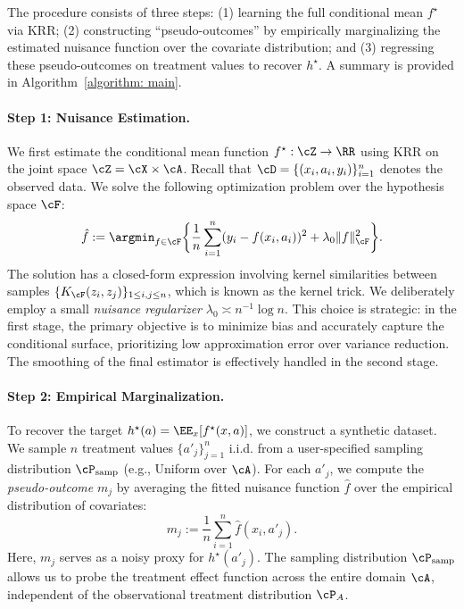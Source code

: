\documentclass[english,11pt]{article}
\begin{document}
The procedure consists of three steps: (1) learning the full conditional mean $f^\star$ via KRR; (2) constructing ``pseudo-outcomes'' by empirically marginalizing the estimated nuisance function over the covariate distribution; and (3) regressing these pseudo-outcomes on treatment values to recover $h^\star$. A summary is provided in Algorithm~\ref{algorithm: main}.

\paragraph{Step 1: Nuisance Estimation.}
We first estimate the conditional mean function $f^\star: \cZ \to \RR$ using KRR on the joint space $\cZ = \cX \times \cA$.
Recall that $\cD = \{(x_i, a_i, y_i)\}_{i=1}^n$ denotes the observed data.
We solve the following optimization problem over the hypothesis space $\cF$:
\begin{equation}\label{equation: nuisance KRR}
	\hat{f} := \argmin_{f \in \cF} \bigg\{ \frac{1}{n}\sum_{i=1}^n (y_i - f(x_i, a_i))^2 + \lambda_0\|f\|_\cF^2 \bigg\}.
\end{equation}
The solution has a closed-form expression involving kernel similarities between samples $\{ K_{\cF} (z_i, z_j) \}_{1 \leq i, j \leq n}$, which is known as the kernel trick. We deliberately employ a small \textit{nuisance regularizer} $\lambda_0 \asymp n^{-1} \log n$. This choice is strategic: in the first stage, the primary objective is to minimize bias and accurately capture the conditional surface, prioritizing low approximation error over variance reduction. The smoothing of the final estimator is effectively handled in the second stage.

\paragraph{Step 2: Empirical Marginalization.}
To recover the target $h^\star(a) = \EE_{x}[f^\star(x, a)]$, we construct a synthetic dataset. We sample $n$ treatment values $\{a'_j\}_{j=1}^n$ i.i.d. from a user-specified sampling distribution $\cP_{\operatorname{samp}}$ (e.g., Uniform over $\cA$). For each $a'_j$, we compute the \emph{pseudo-outcome} $m_j$ by averaging the fitted nuisance function $\hat{f}$ over the empirical distribution of covariates:
\begin{equation}\label{equation: pseudo-outcome}
	m_j := \frac{1}{n} \sum_{i=1}^n \hat{f}(x_i, a'_j).
\end{equation}
Here, $m_j$ serves as a noisy proxy for $h^\star(a'_j)$. The sampling distribution $\cP_{\operatorname{samp}}$ allows us to probe the treatment effect function across the entire domain $\cA$, independent of the observational treatment distribution $\cP_A$.
\end{document}
